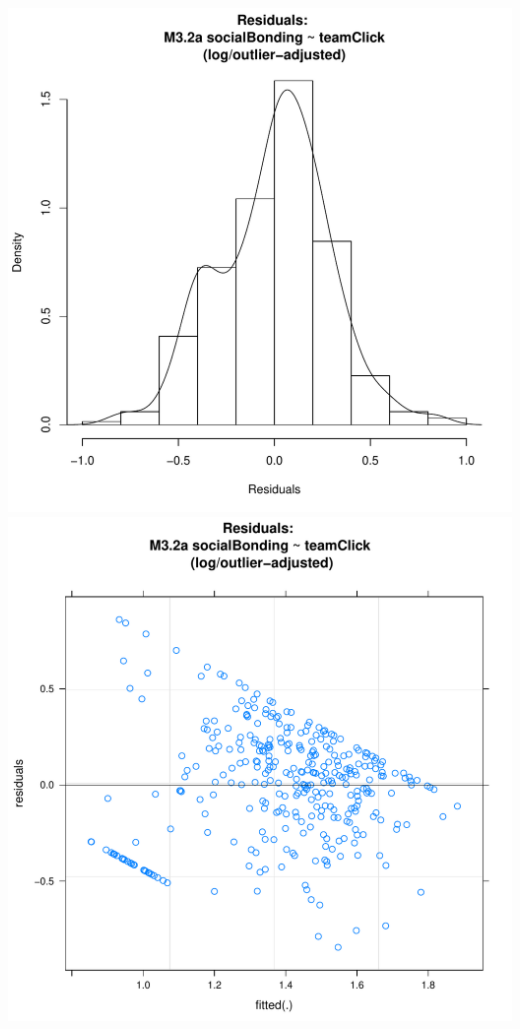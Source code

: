 \documentclass[12pt]{report}
\begin{document}
\newpage
\centering
\includegraphics[scale =.4]{../images/MLM32aOutLogHist.pdf}
\includegraphics[scale =.4]{../images/MLM32aOutLogScatter.pdf}
\end{document}
